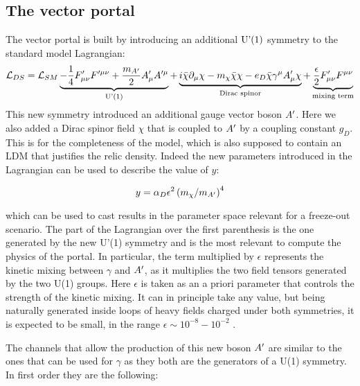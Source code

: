 \subsection{The vector portal}
\label{ch1:sec:dm-colliders}

The vector portal is built by introducing an additional $\textrm{U'(1)}$ symmetry to the standard model Lagrangian:
\begin{equation}
  \label{eq:dm-lagrangian}
  \mathcal{L}_{DS} = \mathcal{L}_{SM} \underbrace{- \frac{1}{4}F'_{\mu \nu}F'^{\mu \nu} + \frac{m_{A'}}{2}A'_{\mu}A'^{\mu}}_{\textrm{U'(1)}} + \underbrace{i \bar{\chi} \partial_{\mu} \chi - m_{\chi}\bar{\chi}\chi - e_D \bar{\chi}\gamma^{\mu}A'_{\mu}\chi}_{\textrm{Dirac spinor}} + \underbrace{\frac{\epsilon}{2}F'_{\mu \nu} F^{\mu \nu}}_{\textrm{mixing term}}
\end{equation}
This new symmetry introduced an additional gauge vector boson $A'$. Here we also added a Dirac spinor field $\chi$ that is coupled to $A'$ by a coupling constant $g_D$. This is for the completeness of the model, which is also supposed to contain an LDM that justifies the relic density. Indeed the new parameters introduced in the Lagrangian can be used to describe the value of $y$:

    \begin{equation}
      \label{eq:dmplane-y-dp}
      y = \alpha_D \epsilon^2 \left(m_{\chi}/ m_{A'} \right)^4 
    \end{equation}

which can be used to cast results in the parameter space relevant for a freeze-out scenario.
The part of the Lagrangian over the first parenthesis is the one generated by the new U'(1) symmetry and is the most relevant to compute the physics of the portal. In particular, the term multiplied by $\epsilon$ represents the kinetic mixing between $\gamma$ and $A'$, as it multiplies the two field tensors generated by the two U(1) groups. Here $\epsilon$ is taken as an a priori parameter that controls the strength of the kinetic mixing. It can in principle take any value, but being naturally generated inside loops of heavy fields charged under both symmetries, it is expected to be small, in the range $\epsilon \sim 10^{-8} - 10^{-2}$ \cite{jdb}. 

The channels that allow the production of this new boson $A'$ are similar to the ones that can be used for $\gamma$ as they both are the generators of a U(1) symmetry. In first order they are the following:

